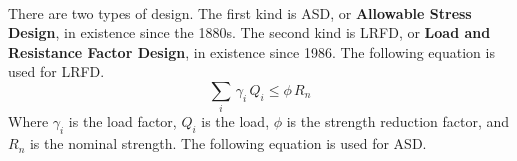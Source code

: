 \documentclass{article}
\begin{document}
\begin{figure}[!ht]
    \centering
\end{figure}
\\
\noindent There are two types of design. The first kind is ASD, or \textbf{Allowable Stress Design}, in existence since the 1880s. The second kind is LRFD, or \textbf{Load and Resistance Factor Design}, in existence since 1986. The following equation is used for LRFD.
\[\sum_i\,\gamma_i\, Q_i\leq \phi\, R_n\] 
\noindent Where \(\gamma_i\) is the load factor, \(Q_i\) is the load, \(\phi\) is the strength reduction factor, and \(R_n\) is the nominal strength. The following equation is used for ASD. 
\end{document}
